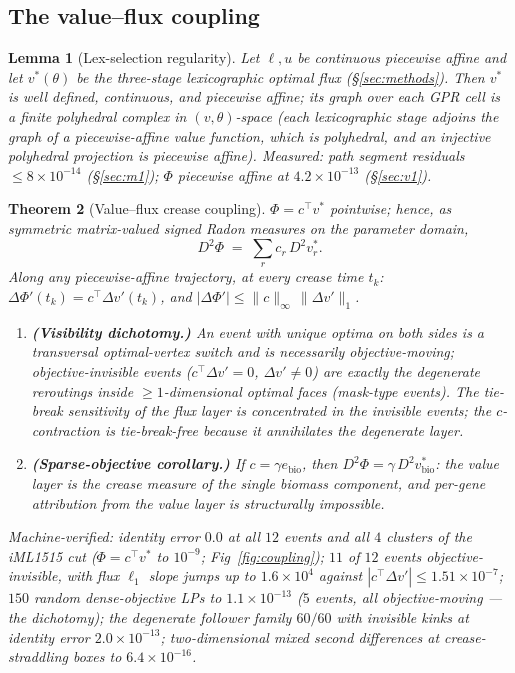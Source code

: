 \documentclass[11pt,a4paper]{article}
\theoremstyle{plain}
\newtheorem{theorem}{Theorem}[section]
\newtheorem{lemma}[theorem]{Lemma}
\theoremstyle{definition}
\theoremstyle{remark}
\begin{document}
\subsection{The value--flux coupling}

\begin{lemma}[Lex-selection regularity]\label{lem:lex}
Let $\ell, u$ be continuous piecewise affine and let $v^*(\theta)$ be
the three-stage lexicographic optimal flux (\S\ref{sec:methods}).
Then $v^*$ is well defined, continuous, and piecewise affine; its
graph over each GPR cell is a finite polyhedral complex in
$(v,\theta)$-space (each
lexicographic stage adjoins the graph of a piecewise-affine value
function, which is polyhedral, and an injective polyhedral projection
is piecewise affine). Measured: path segment residuals $\le 8 \times 10^{-14}$ (\S\ref{sec:m1}); $\Phi$ piecewise affine at $4.2 \times 10^{-13}$ (\S\ref{sec:v1}).
\end{lemma}

\begin{theorem}[Value--flux crease coupling]\label{thm:coupling}
$\Phi = c^\top v^*$ pointwise; hence, as symmetric matrix-valued
signed Radon measures on the parameter domain,
\[
D^2\Phi \;=\; \sum_{r} c_r\, D^2 v^*_r .
\]
Along any piecewise-affine trajectory, at every crease time $t_k$:
$\Delta\Phi'(t_k) = c^\top \Delta v'(t_k)$, and
$|\Delta\Phi'| \le \|c\|_\infty \,\|\Delta v'\|_1$.
\begin{enumerate}[label=(\roman*),leftmargin=2em]
\item \textbf{(Visibility dichotomy.)} An event with unique optima
      on both sides is a transversal optimal-vertex switch and is
      necessarily objective-moving; objective-invisible events
      ($c^\top \Delta v' = 0$, $\Delta v' \neq 0$) are exactly the
      degenerate reroutings inside $\ge 1$-dimensional optimal faces
      (mask-type events). The tie-break sensitivity of the flux layer
      is concentrated in the invisible events; the $c$-contraction is
      tie-break-free because it annihilates the degenerate layer.
\item \textbf{(Sparse-objective corollary.)} If $c =
      \gamma e_{\mathrm{bio}}$, then $D^2\Phi = \gamma\, D^2
      v^*_{\mathrm{bio}}$: the value layer is the crease measure of
      the single biomass component, and per-gene attribution from the
      value layer is structurally impossible.
\end{enumerate}
Machine-verified: identity error $0.0$ at all $12$ events and all
$4$ clusters of the iML1515 cut ($\Phi = c^\top v^*$ to $10^{-9}$;
Fig~\ref{fig:coupling});
$11$ of $12$ events objective-invisible, with flux $\ell_1$ slope
jumps up to $1.6 \times 10^{4}$ against $|c^\top \Delta v'| \le
1.51 \times 10^{-7}$; $150$ random dense-objective LPs to $1.1 \times
10^{-13}$ ($5$ events, all objective-moving --- the dichotomy); the
degenerate follower family $60/60$ with invisible kinks at identity
error $2.0 \times 10^{-13}$; two-dimensional mixed second
differences at crease-straddling boxes to $6.4 \times 10^{-16}$.
\end{theorem}
\end{document}
